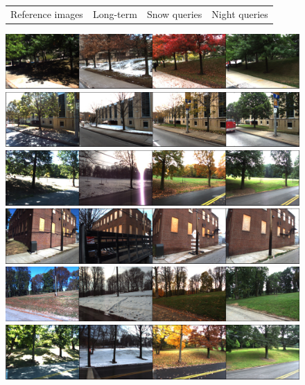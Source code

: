 \begin{figure}
\begin{minipage}{0.435\linewidth}
		\scriptsize
		\begin{tabularx}
		{\linewidth}{X X X X}
			Reference images & 	Long-term & Snow queries & Night queries
		\end{tabularx}
	\end{minipage}\hfill	
	\begin{minipage}{0.555\linewidth}
		\includegraphics[width=\linewidth]{details/cmu_exs/ex1}
		
		\includegraphics[width=\linewidth]{details/cmu_exs/ex6}
		
		\includegraphics[width=\linewidth]{details/cmu_exs/ex4}	
		
		\includegraphics[width=\linewidth]{details/cmu_exs/ex2}	
		
		\includegraphics[width=\linewidth]{details/cmu_exs/ex3}	
		
		\includegraphics[width=\linewidth]{details/cmu_exs/ex5}	
		

\end{minipage}
\end{figure}
